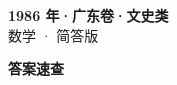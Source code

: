 \documentclass[zihao=-4, a4paper]{ctexart}
\begin{document}
\begin{center}
  {\Large\bfseries 1986 年·广东卷·文史类}\\[4pt]
  {\large 数学 · 简答版}
\end{center}
\medskip
{}

\clearpage
{}
\begin{center}{\Large\bfseries 答案速查}\end{center}
\medskip

\end{document}
